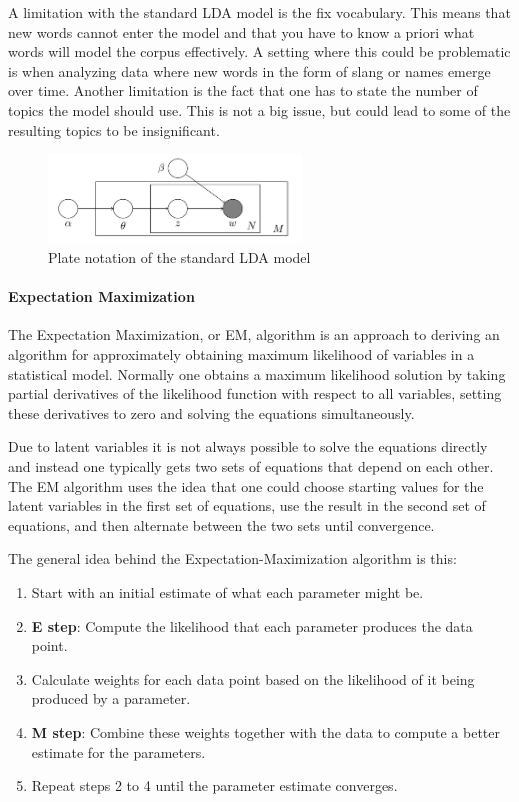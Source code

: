 \documentclass[12pt]{report}
\begin{document}
A limitation with the standard LDA model is the fix vocabulary. This means that
new words cannot enter the model and that you have to know a priori what words
will model the corpus effectively. A setting where this could be problematic is
when analyzing data where new words in the form of slang or names emerge over 
time. Another limitation is the fact that one has to state
the number of topics the model should use. This is not a big issue, but could
lead to some of the resulting topics to be insignificant.
\begin{center}
\begin{figure}[h]
\centering
\includegraphics[width=0.6\textwidth, natwidth=561,natheight=197]{figs/LDA_standard_model.png}
\caption{Plate notation of the standard LDA model}
\end{figure}
\end{center}

\paragraph{Expectation Maximization}

The Expectation Maximization, or EM, algorithm is an approach to deriving an
algorithm for approximately obtaining maximum likelihood of variables in a
statistical model. Normally one obtains a maximum likelihood solution by taking
partial derivatives of the likelihood function with respect to all variables,
setting these derivatives to zero and solving the equations simultaneously.
\cite{Myung:2003}

Due to latent variables it is not always possible to solve the equations
directly and instead one typically gets two sets of equations that depend on
each other. The EM algorithm uses the idea that one could choose starting
values for the latent variables in the first set of equations, use the result
in the second set of equations, and then alternate between the two sets until
convergence.

The general idea behind the Expectation-Maximization algorithm is this:

\begin{enumerate}
\item Start with an initial estimate of what each parameter might be.
\item \textbf{E step}: Compute the likelihood that each parameter produces 
the data point.
\item Calculate weights for each data point based on the likelihood of it 
being produced by a parameter.
\item \textbf{M step}: Combine these weights together with the data to 
compute a better estimate for the parameters.
\item Repeat steps 2 to 4 until the parameter estimate converges.
\end{enumerate}
\end{document}
